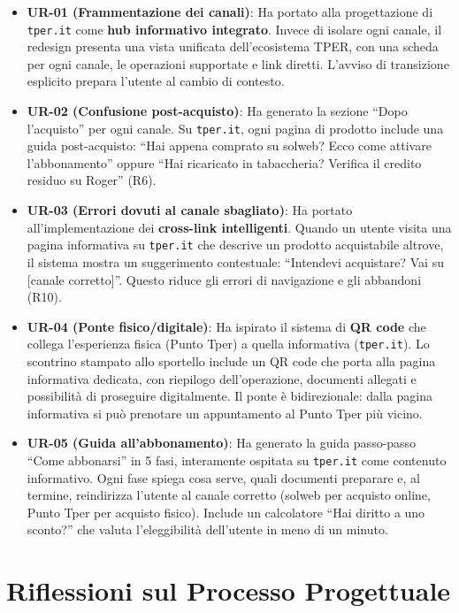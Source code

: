 \begin{itemize}
    \item \textbf{UR-01 (Frammentazione dei canali)}: Ha portato alla progettazione di \texttt{tper.it} come \textbf{hub informativo integrato}. Invece di isolare ogni canale, il redesign presenta una vista unificata dell'ecosistema TPER, con una scheda per ogni canale, le operazioni supportate e link diretti. L'avviso di transizione esplicito prepara l'utente al cambio di contesto.
    \item \textbf{UR-02 (Confusione post-acquisto)}: Ha generato la sezione ``Dopo l'acquisto'' per ogni canale. Su \texttt{tper.it}, ogni pagina di prodotto include una guida post-acquisto: ``Hai appena comprato su solweb? Ecco come attivare l'abbonamento'' oppure ``Hai ricaricato in tabaccheria? Verifica il credito residuo su Roger'' (R6).
    \item \textbf{UR-03 (Errori dovuti al canale sbagliato)}: Ha portato all'implementazione dei \textbf{cross-link intelligenti}. Quando un utente visita una pagina informativa su \texttt{tper.it} che descrive un prodotto acquistabile altrove, il sistema mostra un suggerimento contestuale: ``Intendevi acquistare? Vai su [canale corretto]''. Questo riduce gli errori di navigazione e gli abbandoni (R10).
    \item \textbf{UR-04 (Ponte fisico/digitale)}: Ha ispirato il sistema di \textbf{QR code} che collega l'esperienza fisica (Punto Tper) a quella informativa (\texttt{tper.it}). Lo scontrino stampato allo sportello include un QR code che porta alla pagina informativa dedicata, con riepilogo dell'operazione, documenti allegati e possibilit\`a di proseguire digitalmente. Il ponte \`e bidirezionale: dalla pagina informativa si pu\`o prenotare un appuntamento al Punto Tper pi\`u vicino.
    \item \textbf{UR-05 (Guida all'abbonamento)}: Ha generato la guida passo-passo ``Come abbonarsi'' in 5 fasi, interamente ospitata su \texttt{tper.it} come contenuto informativo. Ogni fase spiega cosa serve, quali documenti preparare e, al termine, reindirizza l'utente al canale corretto (solweb per acquisto online, Punto Tper per acquisto fisico). Include un calcolatore ``Hai diritto a uno sconto?'' che valuta l'eleggibilit\`a dell'utente in meno di un minuto.
\end{itemize}

\vspace{0.3cm}

\section{Riflessioni sul Processo Progettuale}


